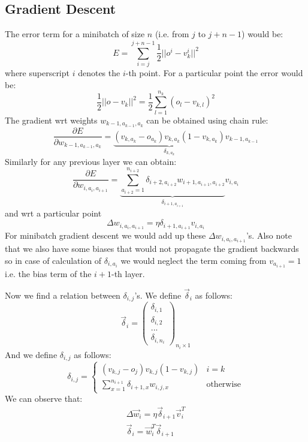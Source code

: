 \documentclass{article}
\begin{document}
\subsection{Gradient Descent}
The error term for a minibatch of size $n$ (i.e. from $j$ to $j+n-1$) would be:
$$E = \sum_{i=j}^{j+n-1}\frac 12 || o^i- v_{k}^i||^2$$
where superscript $i$ denotes the $i$-th point.
For a particular point the error would be:
$$\frac 12 || o- v_{k}||^2=\frac 12\sum_{l=1}^{n_k}(o_{l}-v_{k,l})^2$$
The gradient wrt weights $w_{k-1,a_{k-1},a_{k}}$ can be obtained using chain rule:\\
$$\frac{\partial E}{\partial w_{k-1,a_{k-1},a_{k}}}=\underbrace{(v_{k,a_k}-o_{a_k})v_{k,a_k}(1-v_{k,a_k})}_{\delta_{k,a_k}}v_{k-1,a_{k-1}}$$
Similarly for any previous layer we can obtain:\\
$$\frac{\partial E}{\partial w_{i,a_i,a_{i+1}}}=\underbrace{\sum_{a_{i+2}=1}^{n_{i+2}} \delta_{i+2,a_{i+2}}w_{i+1,a_{i+1},a_{i+2}}}_{\delta_{i+1,a_{i+1}}}v_{i,a_i}$$
and wrt a particular point\\
$$\Delta w_{i,a_i,a_{i+1}}=\eta \delta_{i+1,a_{i+1}}v_{i,a_i}$$
For minibatch gradient descent we would add up these $\Delta w_{i,a_i,a_{i+1}}$'s. Also note that we also have some biases that would not propagate the gradient backwards so in case of calculation of $\delta_{i,a_i}$ we would neglect the term coming from $v_{a_{i+1}}=1$ i.e. the bias term of the $i+1$-th layer.

Now we find a relation between $\delta_{i,j}$'s. We define $\vec \delta_i$ as follows:
$$\vec \delta_i=\begin{pmatrix}\delta_{i,1}\\\delta_{i,2}\\...\\\delta_{i,n_i}\end{pmatrix}_{n_i\times 1}$$
And we define $\delta_{i,j}$ as follows:
$$\delta_{i,j}=\begin{cases}(v_{k,j}-o_j)v_{k,j}(1-v_{k,j})&i=k\\\displaystyle\sum_{x=1}^{n_{i+1}}\delta_{i+1,x}w_{i,j,x}&\text{otherwise}\end{cases}$$
We can observe that:
\begin{gather*}\Delta\vec w_{i}=\eta \vec \delta_{i+1}\vec v_{i}^T\\
\vec\delta_i=\vec w_i^T\vec \delta_{i+1}
\end{gather*}
\end{document}
